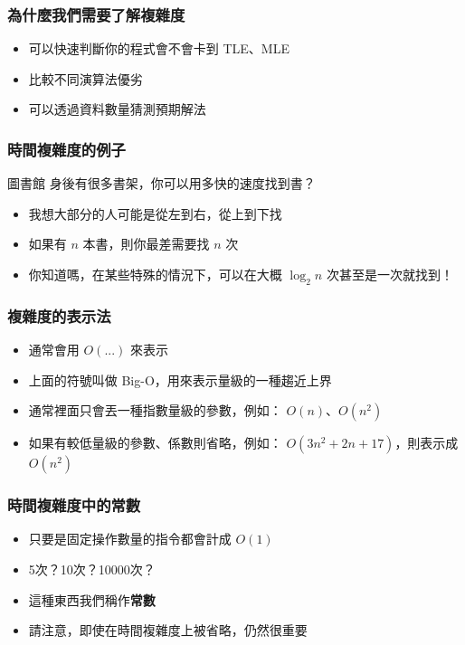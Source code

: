\documentclass[mathserif]{beamer}
\begin{document}
\begin{frame}
    \frametitle{為什麼我們需要了解複雜度}
    \begin{itemize}
        \item 可以快速判斷你的程式會不會卡到 TLE、MLE
        \item 比較不同演算法優劣
        \item 可以透過資料數量猜測預期解法
    \end{itemize}
\end{frame}

\begin{frame}
    \frametitle{時間複雜度的例子}
    \begin{block}{圖書館}
        身後有很多書架，你可以用多快的速度找到書？
    \end{block}
    \begin{itemize}
        \item<2-> 我想大部分的人可能是從左到右，從上到下找
        \item<2-> 如果有 $n$ 本書，則你最差需要找 $n$ 次
        \item<3-> 你知道嗎，在某些特殊的情況下，可以在大概 $\log_2{n}$ 次甚至是一次就找到！
    \end{itemize}
\end{frame}

\begin{frame}
    \frametitle{複雜度的表示法}
    \begin{itemize}
        \item 通常會用 $O(...)$ 來表示
        \item 上面的符號叫做 Big-O，用來表示量級的一種趨近上界
        \item<2-> 通常裡面只會丟一種指數量級的參數，例如： $O(n)$、$O(n^2)$
        \item<2-> 如果有較低量級的參數、係數則省略，例如： $O(3n^2+2n+17)$，則表示成 $O(n^2)$
    \end{itemize}
\end{frame}

\begin{frame}
    \frametitle{時間複雜度中的常數}
    \begin{itemize}
        \item 只要是固定操作數量的指令都會計成 $O(1)$
        \item 5次？10次？10000次？
        \item<2-> 這種東西我們稱作\textbf{常數}
        \item<2-> 請注意，即使在時間複雜度上被省略，仍然很重要
    \end{itemize}
\end{frame}
\end{document}
